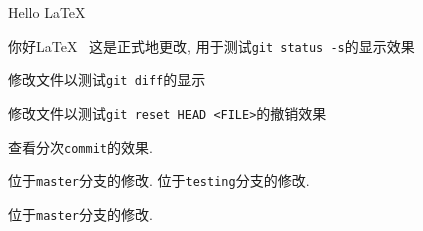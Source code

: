 \documentclass{ctexart}
\begin{document}
    Hello \LaTeX~

    你好\LaTeX~ %
    这是正式地更改, 用于测试\verb|git status -s|的显示效果

    修改文件以测试\verb|git diff|的显示

    修改文件以测试\verb|git reset HEAD <FILE>|的撤销效果

    查看分次\verb|commit|的效果. 

    位于\verb|master|分支的修改. 
    位于\verb|testing|分支的修改. 

    位于\verb|master|分支的修改. 
\end{document}
